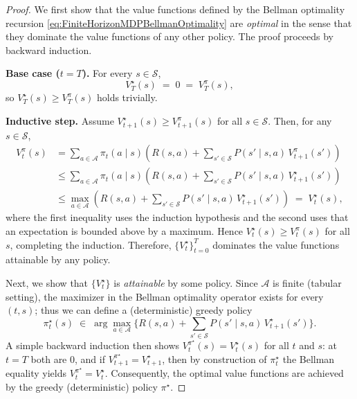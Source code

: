 \documentclass[
]{book}
\theoremstyle{definition}
\theoremstyle{definition}
\theoremstyle{definition}
\theoremstyle{definition}
\theoremstyle{remark}
\begin{document}
\begin{proof}
We first show that the value functions defined by the Bellman optimality recursion \eqref{eq:FiniteHorizonMDPBellmanOptimality} are \emph{optimal} in the sense that they dominate the value functions of any other policy. The proof proceeds by backward induction.

\textbf{Base case (\(t=T\)).}
For every \(s\in\mathcal{S}\),
\[
V^\star_T(s)\;=\;0\;=\;V_T^{\pi}(s),
\]
so \(V^\star_T(s)\ge V_T^{\pi}(s)\) holds trivially.

\textbf{Inductive step.}
Assume \(V^\star_{t+1}(s)\ge V^{\pi}_{t+1}(s)\) for all \(s\in\mathcal{S}\). Then, for any \(s\in\mathcal{S}\),
\begin{align*}
V_t^{\pi}(s)
&= \sum_{a\in\mathcal{A}} \pi_t(a\mid s)\!\left(R(s,a)+\sum_{s'\in\mathcal{S}} P(s'\mid s,a)\,V_{t+1}^{\pi}(s')\right) \\
&\le \sum_{a\in\mathcal{A}} \pi_t(a\mid s)\!\left(R(s,a)+\sum_{s'\in\mathcal{S}} P(s'\mid s,a)\,V_{t+1}^{\star}(s')\right) \\
&\le \max_{a\in\mathcal{A}} \left(R(s,a)+\sum_{s'\in\mathcal{S}} P(s'\mid s,a)\,V_{t+1}^{\star}(s')\right)
\;=\; V_t^\star(s),
\end{align*}
where the first inequality uses the induction hypothesis and the second uses that an expectation is bounded above by a maximum. Hence \(V_t^\star(s)\ge V_t^{\pi}(s)\) for all \(s\), completing the induction. Therefore, \(\{V_t^\star\}_{t=0}^T\) dominates the value functions attainable by any policy.

Next, we show that \(\{V_t^\star\}\) is \emph{attainable} by some policy. Since \(\mathcal{A}\) is finite (tabular setting), the maximizer in the Bellman optimality operator exists for every \((t,s)\); thus we can define a (deterministic) greedy policy
\[
\pi_t^\star(s)\;\in\;\arg\max_{a\in\mathcal{A}}
\Big\{ R(s,a)+\sum_{s'\in\mathcal{S}} P(s'\mid s,a)\,V_{t+1}^\star(s') \Big\}.
\]
A simple backward induction then shows \(V_t^{\pi^\star}(s)=V_t^\star(s)\) for all \(t\) and \(s\): at \(t=T\) both are \(0\), and if \(V_{t+1}^{\pi^\star}=V_{t+1}^\star\), then by construction of \(\pi_t^\star\) the Bellman equality yields \(V_t^{\pi^\star}=V_t^\star\). Consequently, the optimal value functions are achieved by the greedy (deterministic) policy \(\pi^\star\).
\end{proof}
\end{document}
